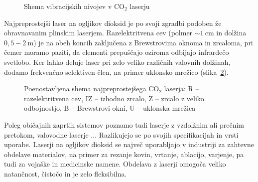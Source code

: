 \begin{figure}[h]
\centering
\def\svgwidth{95truemm} 

\caption{Shema vibracijskih nivojev v CO$_2$ laserju}
\label{fig:CO2E}
\end{figure}

Najpreprostejši laser na ogljikov dioksid  
je po svoji zgradbi podoben že obravnavanim plinskim laserjem. 
Razelektritvena cev (polmer $\sim 1~\si{\centi\metre}$ in dolžina $0,5-2~\si{\metre}$) 
je na obeh koncih zaključena z Brewstrovima oknoma in zrcaloma, pri čemer moramo paziti,
da elementi prepuščajo oziroma odbijajo infrardečo svetlobo. Ker lahko deluje
laser pri zelo veliko različnih valovnih dolžinah, dodamo frekvenčno selektiven
člen, na primer uklonsko mrežico (slika~\ref{fig:CO2S}).

\begin{figure}[h]
\centering
\def\svgwidth{100truemm} 

\caption{Poenostavljena shema najpreprostejšega CO$_2$ laserja: R -- razelektritvena cev, 
IZ -- izhodno zrcalo, Z -- zrcalo z veliko odbojnostjo, B -- Brewstrovi okni, 
U -- uklonska mrežica
}
\label{fig:CO2S}
\end{figure}

Poleg običajnih zaprtih sistemov poznamo tudi laserje z vzdolžnim ali prečnim pretokom, 
valovodne laserje ... Razlikujejo se po svojih specifikacijah in vrsti uporabe.
Laserji na ogljikov dioksid se največ uporabljajo v industriji za zahtevne 
obdelave materialov, na primer za rezanje 
kovin, vrtanje, ablacijo, varjenje, pa tudi za vojaške in medicinske namene.
Obdelava z laserji omogoča veliko natančnost, čistočo in je zelo fleksibilna.

